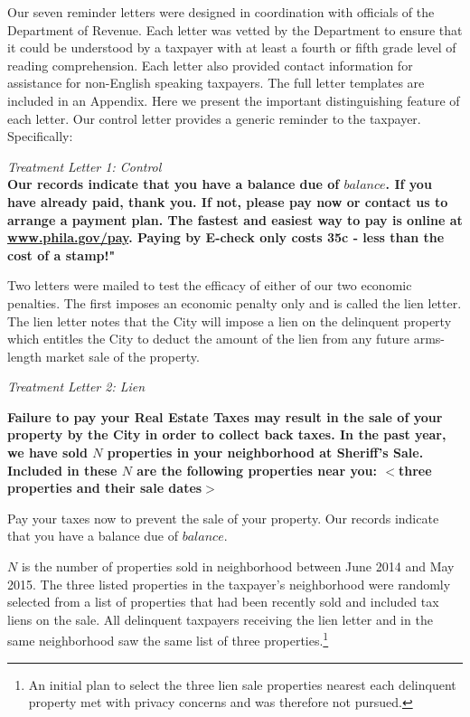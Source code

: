 \documentclass[12pt]{article}
\begin{document}
Our seven reminder letters were designed in coordination with
officials of the Department of Revenue.  Each letter was vetted by the
Department to ensure that it could be understood by a taxpayer with at
least a fourth or fifth grade level of reading comprehension.  Each
letter also provided contact information for assistance for
non-English speaking taxpayers.  The full letter templates are
included in an Appendix.  Here we present the important distinguishing
feature of each letter.  Our control letter provides a generic
reminder to the taxpayer. Specifically:
 
{\it Treatment Letter 1: Control } \\ {\bf Our records indicate that
  you have a balance due of $balance$.  If you have already paid,
  thank you. If not, please pay now or contact us to arrange a payment
  plan. The fastest and easiest way to pay is online at
  \underline{www.phila.gov/pay}. Paying by E-check only costs 35c -
  less than the cost of a stamp!"}

Two letters were mailed to test the efficacy of either of our two
economic penalties.  The first imposes an economic penalty only and is
called the lien letter.  The lien letter notes that the City will
impose a lien on the delinquent property which entitles the City to
deduct the amount of the lien from any future arms-length market sale
of the property.
        
{\it Treatment Letter 2: Lien } \\ {\bf Failure to pay your Real
  Estate Taxes may result in the sale of your property by the City in
  order to collect back taxes. In the past year, we have sold $N$
  properties in your neighborhood at Sheriff's Sale. Included in these
  $N$ are the following properties near you: $<$three properties and
  their sale dates$>$

  Pay your taxes now to prevent the sale of your property.  Our
  records indicate that you have a balance due of $balance$.}

$N$ is the number of properties sold in neighborhood between June 2014
and May 2015. The three listed properties in the taxpayer's
neighborhood were randomly selected from a list of properties that had
been recently sold and included tax liens on the sale.  All delinquent
taxpayers receiving the lien letter and in the same neighborhood saw
the same list of three properties.\footnote{An initial plan to select
  the three lien sale properties nearest each delinquent property met
  with privacy concerns and was therefore not pursued.}
\end{document}
